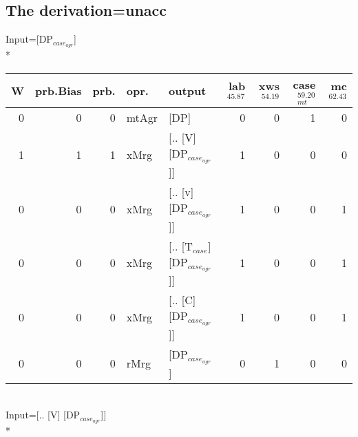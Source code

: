\subsection{The derivation=unacc}
\begingroup\scriptsize Input=[DP$_{case_{agr}}$]\\*
\begin{tabularx}{\linewidth}{rrrlXrrrr}
\hline
   W &   prb.Bias &   prb. & opr.    & output                      &   lab$^{45.87}$ &   xws$^{54.19}$ &   case$_{mt}^{59.20}$ &   mc$^{62.43}$ \\
\hline
   0 &       0 &   0 & mtAgr & [DP]                        &             0 &             0 &                 1 &            0 \\
   1 &       1 &   1 & xMrg  & [.. [V] [DP$_{case_{agr}}$]]      &             1 &             0 &                 0 &            0 \\
   0 &       0 &   0 & xMrg  & [.. [v] [DP$_{case_{agr}}$]]      &             1 &             0 &                 0 &            1 \\
   0 &       0 &   0 & xMrg  & [.. [T$_{case}$] [DP$_{case_{agr}}$]] &             1 &             0 &                 0 &            1 \\
   0 &       0 &   0 & xMrg  & [.. [C] [DP$_{case_{agr}}$]]      &             1 &             0 &                 0 &            1 \\
   0 &       0 &   0 & rMrg  & [DP$_{case_{agr}}$]               &             0 &             1 &                 0 &            0 \\
\hline
\end{tabularx}\endgroup\\
\begingroup\scriptsize Input=[.. [V] [DP$_{case_{agr}}$]]\\*
